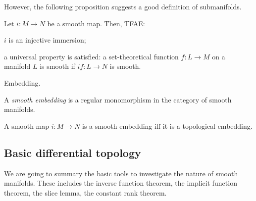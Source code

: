 \documentclass{../exp}
\begin{document}
However, the following proposition suggests a good definition of submanifolds.
\begin{prop}
Let $i:M\to N$ be a smooth map.
Then, TFAE:
\begin{cond}
\item $i$ is an injective immersion;
\item a universal property is satisfied: a set-theoretical function $f:L\to M$ on a manifold $L$ is smooth if $if:L\to N$ is smooth.
\end{cond}
\end{prop}


Embedding.

\begin{defn}
A \emph{smooth embedding} is a regular monomorphism in the category of smooth manifolds.
\end{defn}
\begin{prop}
A smooth map $i:M\to N$ is a smooth embedding iff it is a topological embedding.
\end{prop}










\subsection{Basic differential topology}
We are going to summary the basic tools to investigate the nature of smooth manifolds.
These includes the inverse function theorem, the implicit function theorem, the slice lemma, the constant rank theorem.
\end{document}
